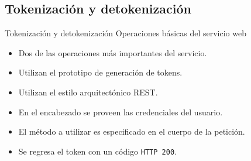 %
%
%

\subsection{Tokenización y detokenización}

\begin{frame}{Tokenización y detokenización}
  {Operaciones básicas del servicio web}

  \begin{itemize}
    \item Dos de las operaciones más importantes del servicio.
    \item Utilizan el prototipo de generación de tokens.
    \item Utilizan el estilo arquitectónico REST\footnotemark{}.
    \item En el encabezado se proveen las credenciales del usuario.
    \item El método a utilizar es especificado en el cuerpo de la petición.
    \item Se regresa el token con un código \texttt{HTTP 200}.
  \end{itemize}


\end{frame}

